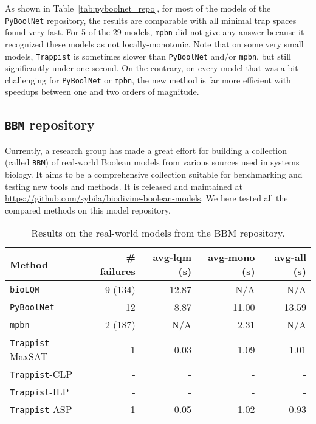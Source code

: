 \documentclass[preprint,12pt]{elsarticle}
\newcounter{rownumber}
\begin{document}
As shown in Table~\ref{tab:pyboolnet_repo}, for most of the models of the \texttt{PyBoolNet} repository, the results are comparable with all minimal trap spaces found very fast.
For 5 of the 29 models, \texttt{mpbn} did not give any answer because it recognized these models as not locally-monotonic.
Note that on some very small models, \texttt{Trappist} is sometimes slower than \texttt{PyBoolNet} and/or \texttt{mpbn}, but still significantly under one second.
On the contrary, on every model that was a bit challenging for \texttt{PyBoolNet} or \texttt{mpbn}, the new method is far more efficient with speedups between one and two orders of magnitude.

\subsection{\texttt{BBM} repository}

Currently, a research group has made a great effort for building a collection (called \texttt{BBM}) of real-world Boolean models from various sources used in systems biology.
It aims to be a comprehensive collection suitable for benchmarking and testing new tools and methods.
It is released and maintained at \url{https://github.com/sybila/biodivine-boolean-models}.
We here tested all the compared methods on this model repository.

\setlength{\tabcolsep}{4pt}
\begin{table}[!htb]
  \caption{Results on the real-world models from the BBM repository.}
  \centering%
  \label{tab:bbm_repo}
  \begin{tabular}{lrrrr}
    \toprule
    Method & \# failures & avg-lqm (s) & avg-mono (s) & avg-all (s) \\ \midrule
    \texttt{bioLQM} & 9 (134) & 12.87 & N/A & N/A \\
    \texttt{PyBoolNet} & 12 & 8.87 & 11.00 & 13.59 \\
    \texttt{mpbn} & 2 (187) & N/A & 2.31 & N/A \\
    \texttt{Trappist}-MaxSAT & 1 & 0.03 & 1.09 & 1.01 \\
    \texttt{Trappist}-CLP & - & - & - & - \\
    \texttt{Trappist}-ILP & - & - & - & - \\
    \texttt{Trappist}-ASP & 1 & 0.05 & 1.02 & 0.93 \\
    \bottomrule
  \end{tabular}
\end{table}
\setcounter{rownumber}{0}
\end{document}
